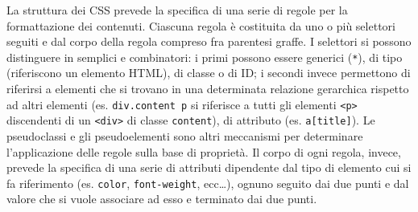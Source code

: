 \begin{description}
La struttura dei CSS prevede la specifica di una serie di regole per la formattazione dei contenuti. Ciascuna regola è costituita da uno o più selettori seguiti e dal corpo della regola compreso fra parentesi graffe. I selettori si possono distinguere in semplici e combinatori: i primi possono essere generici (\texttt{*}), di tipo (riferiscono un elemento HTML), di classe o di ID; i secondi invece permettono di riferirsi a elementi che si trovano in una determinata relazione gerarchica rispetto ad altri elementi (es. \texttt{div.content p} si riferisce a tutti gli elementi \texttt{<p>} discendenti di un \texttt{<div>} di classe \texttt{content}), di attributo (es. \texttt{a[title]}). Le pseudoclassi e gli pseudoelementi sono altri meccanismi per determinare l'applicazione delle regole sulla base di proprietà. Il corpo di ogni regola, invece, prevede la specifica di una serie di attributi dipendente dal tipo di elemento cui si fa riferimento (es. \texttt{color}, \texttt{font-weight}, ecc\dots), ognuno seguito dai due punti e dal valore che si vuole associare ad esso e terminato dai due punti.


\end{description}
